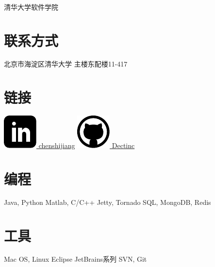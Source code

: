 \documentclass[]{friggeri-cv-cn}
\begin{document}
       {清华大学软件学院}

\begin{aside}
  \section{联系方式}
    北京市海淀区清华大学
    主楼东配楼11-417
  \section{链接}
    \href{http://www.linkedin.com/in/chenshijiang}{\includegraphics[width=.8em]{icons/linkedin.pdf} chenshijiang}
    \href{https://github.com/Dectinc}{\includegraphics[width=.9em]{icons/github.pdf} Dectinc}
  \section{编程}
    Java, Python
    Matlab, C/C++
    Jetty, Tornado
    SQL, MongoDB, Redis
  \section{工具}
    Mac OS, Linux
    Eclipse
    JetBrains系列
    SVN, Git
\end{aside}
\end{document}
